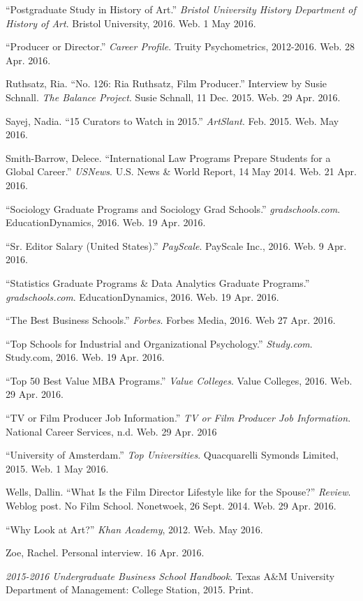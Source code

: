 \begin{workscited}
\begin{flushleft}
\bibent
“Postgraduate Study in History of Art.” \textit{Bristol University History Department of History of Art}. Bristol University, 2016. Web. 1 May 2016.

\bibent
“Producer or Director.” \textit{Career Profile}. Truity Psychometrics, 2012-2016. Web. 28 Apr. 2016.

\bibent
Ruthsatz, Ria. “No. 126: Ria Ruthsatz, Film Producer.” Interview by Susie Schnall. \textit{The Balance Project}. Susie Schnall, 11 Dec. 2015. Web. 29 Apr. 2016.

\bibent
Sayej, Nadia. “15 Curators to Watch in 2015.” \textit{ArtSlant}. Feb. 2015. Web. May 2016.

\bibent
Smith-Barrow, Delece. “International Law Programs Prepare Students for a Global Career.” \textit{USNews}. U.S. News \& World Report, 14 May 2014. Web. 21 Apr. 2016. 

\bibent
“Sociology Graduate Programs and Sociology Grad Schools.” \textit{gradschools.com}. EducationDynamics, 2016. Web. 19 Apr. 2016. 

\bibent
“Sr. Editor Salary (United States).” \textit{PayScale}. PayScale Inc., 2016. Web. 9 Apr. 2016.

\bibent
“Statistics Graduate Programs \& Data Analytics Graduate Programs.” \textit{gradschools.com}. EducationDynamics, 2016. Web. 19 Apr. 2016. 

\bibent
“The Best Business Schools.” \textit{Forbes}. Forbes Media, 2016. Web 27 Apr. 2016.

\bibent
“Top Schools for Industrial and Organizational Psychology.” \textit{Study.com}. Study.com, 2016. Web. 19 Apr. 2016. 

\bibent
“Top 50 Best Value MBA Programs.” \textit{Value Colleges}. Value Colleges, 2016. Web. 29 Apr. 2016.

\bibent
“TV or Film Producer Job Information.” \textit{TV or Film Producer Job Information}. National Career Services, n.d. Web. 29 Apr. 2016

\bibent
“University of Amsterdam.” \textit{Top Universities}. Quacquarelli Symonds Limited, 2015. Web. 1 May 2016.

\bibent
Wells, Dallin. “What Is the Film Director Lifestyle like for the Spouse?” \textit{Review}. Weblog post. No Film School. Nonetwoek, 26 Sept. 2014. Web. 29 Apr. 2016.

\bibent
“Why Look at Art?” \textit{Khan Academy}, 2012. Web. May 2016.

\bibent
Zoe, Rachel. Personal interview. 16 Apr. 2016.

\bibent
\textit{2015-2016 Undergraduate Business School Handbook}. Texas A\&M University Department of Management: College Station, 2015. Print.

\end{flushleft}
\end{workscited} 